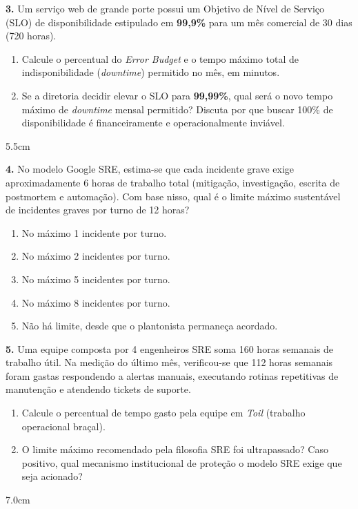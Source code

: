 \documentclass[12pt]{article}
\begin{document}
\textbf{3.} Um serviço web de grande porte possui um Objetivo de Nível de Serviço (SLO) de disponibilidade estipulado em \textbf{99,9\%} para um mês comercial de 30 dias (720 horas).
\begin{enumerate}[label=\alph*)]
    \item Calcule o percentual do \textit{Error Budget} e o tempo máximo total de indisponibilidade (\textit{downtime}) permitido no mês, em minutos.
    \item Se a diretoria decidir elevar o SLO para \textbf{99,99\%}, qual será o novo tempo máximo de \textit{downtime} mensal permitido? Discuta por que buscar 100\% de disponibilidade é financeiramente e operacionalmente inviável.
\end{enumerate}
\begin{resposta}{5.5cm}
\end{resposta}

\vspace{0.4cm}

\textbf{4.} No modelo Google SRE, estima-se que cada incidente grave exige aproximadamente 6 horas de trabalho total (mitigação, investigação, escrita de postmortem e automação). Com base nisso, qual é o limite máximo sustentável de incidentes graves por turno de 12 horas?
\begin{enumerate}[label=\alph*)]
    \item No máximo 1 incidente por turno.
    \item No máximo 2 incidentes por turno.
    \item No máximo 5 incidentes por turno.
    \item No máximo 8 incidentes por turno.
    \item Não há limite, desde que o plantonista permaneça acordado.
\end{enumerate}

\vspace{0.4cm}

\textbf{5.} Uma equipe composta por 4 engenheiros SRE soma 160 horas semanais de trabalho útil. Na medição do último mês, verificou-se que 112 horas semanais foram gastas respondendo a alertas manuais, executando rotinas repetitivas de manutenção e atendendo tickets de suporte.
\begin{enumerate}[label=\alph*)]
    \item Calcule o percentual de tempo gasto pela equipe em \textit{Toil} (trabalho operacional braçal).
    \item O limite máximo recomendado pela filosofia SRE foi ultrapassado? Caso positivo, qual mecanismo institucional de proteção o modelo SRE exige que seja acionado?
\end{enumerate}
\begin{resposta}{7.0cm}
\end{resposta}
\end{document}
